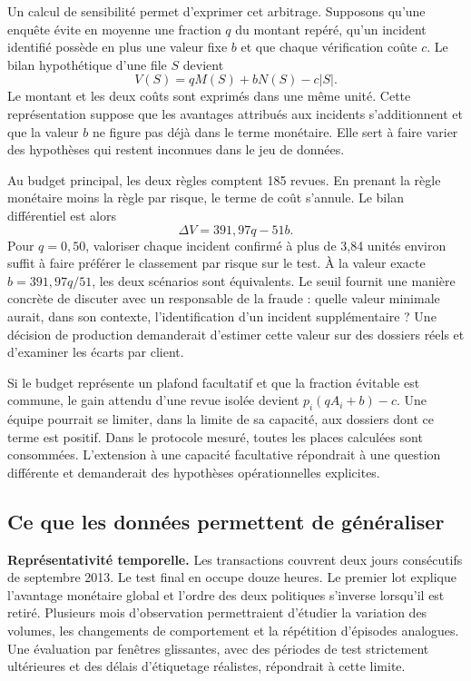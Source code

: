 \documentclass[11pt,a4paper]{article}
\begin{document}
Un calcul de sensibilité permet d'exprimer cet arbitrage. Supposons qu'une enquête évite en moyenne une fraction $q$ du montant repéré, qu'un incident identifié possède en plus une valeur fixe $b$ et que chaque vérification coûte $c$. Le bilan hypothétique d'une file $S$ devient
\begin{equation}
 V(S)=qM(S)+bN(S)-c|S| .
 \label{eq:valeur}
\end{equation}
Le montant et les deux coûts sont exprimés dans une même unité. Cette représentation suppose que les avantages attribués aux incidents s'additionnent et que la valeur $b$ ne figure pas déjà dans le terme monétaire. Elle sert à faire varier des hypothèses qui restent inconnues dans le jeu de données.

Au budget principal, les deux règles comptent 185 revues. En prenant la règle monétaire moins la règle par risque, le terme de coût s'annule. Le bilan différentiel est alors
\[
 \Delta V=391{,}97q-51b .
\]
Pour $q=0{,}50$, valoriser chaque incident confirmé à plus de 3,84 unités environ suffit à faire préférer le classement par risque sur le test. À la valeur exacte $b=391{,}97q/51$, les deux scénarios sont équivalents. Le seuil fournit une manière concrète de discuter avec un responsable de la fraude : quelle valeur minimale aurait, dans son contexte, l'identification d'un incident supplémentaire ? Une décision de production demanderait d'estimer cette valeur sur des dossiers réels et d'examiner les écarts par client.

Si le budget représente un plafond facultatif et que la fraction évitable est commune, le gain attendu d'une revue isolée devient $p_i(qA_i+b)-c$. Une équipe pourrait se limiter, dans la limite de sa capacité, aux dossiers dont ce terme est positif. Dans le protocole mesuré, toutes les places calculées sont consommées. L'extension à une capacité facultative répondrait à une question différente et demanderait des hypothèses opérationnelles explicites.

\subsection{Ce que les données permettent de généraliser}
\textbf{Représentativité temporelle.} Les transactions couvrent deux jours consécutifs de septembre 2013. Le test final en occupe douze heures. Le premier lot explique l'avantage monétaire global et l'ordre des deux politiques s'inverse lorsqu'il est retiré. Plusieurs mois d'observation permettraient d'étudier la variation des volumes, les changements de comportement et la répétition d'épisodes analogues. Une évaluation par fenêtres glissantes, avec des périodes de test strictement ultérieures et des délais d'étiquetage réalistes, répondrait à cette limite.
\end{document}
